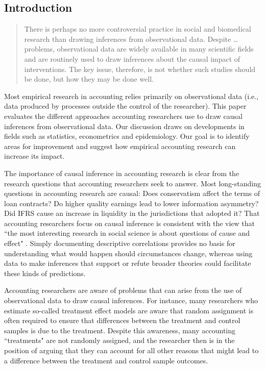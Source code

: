 \documentclass[11pt,reqno,titlepage]{amsart}
\begin{document}
\begin{doublespace} 
\section{Introduction}

\begin{quotation}
	There is perhaps no more controversial practice in social and biomedical research than drawing inferences from observational data.
	Despite \dots problems, observational data are widely available in many scientific fields and are routinely used to draw inferences about the causal impact of interventions.
	The key issue, therefore, is not whether such studies should be done, but how they may be done well.
\end{quotation}

Most empirical research in accounting relies primarily on observational data (i.e., data produced by processes outside the control of the researcher).
This paper evaluates the different approaches accounting researchers use to draw causal inferences from observational data. 
Our discussion draws on developments in 
fields such as statistics, econometrics and epidemiology. Our goal is to identify areas for improvement and suggest how empirical accounting research can increase its impact.

The importance of causal inference in accounting research is clear from the research questions that accounting researchers seek to answer. 
Most long-standing questions in accounting research are causal: 
Does conservatism affect the terms of loan contracts?
Do higher quality earnings lead to lower information asymmetry? 
Did IFRS cause an increase in liquidity in the jurisdictions that adopted it?
That accounting researchers focus on causal inference is consistent with the view that ``the most interesting research in social science is about questions of cause and effect" \cite[p. 3]{Angrist:2008vk}.
Simply documenting descriptive correlations provides no basis for understanding what would happen should circumstances change, 
whereas using data to make inferences that support or refute broader theories could facilitate these kinds of predictions.

Accounting researchers are aware of problems that can arise from the use of observational data to draw causal inferences.
For instance, many researchers who estimate so-called treatment effect models are aware that random assignment is often required to ensure that differences between the treatment and control samples is due to the treatment. 
Despite this awareness, many accounting ``treatments" are not randomly assigned, and the researcher then is in the position of arguing that they can account for all other reasons that might lead to a difference between the treatment and control sample outcomes.


\end{doublespace}
\end{document}
